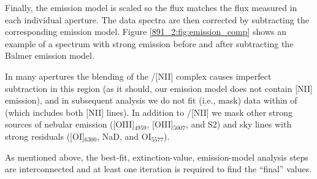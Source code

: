 Finally, the emission model is scaled so the \Ha flux matches the \Ha
flux measured in each individual aperture. The data spectra are then
corrected by subtracting the corresponding emission model. Figure
\ref{891_2:fig:emission_comp} shows an example of a spectrum with strong \HB
emission before and after subtracting the Balmer emission model.

In many apertures the blending of the \Ha/[NII] complex causes
imperfect subtraction in this region (as it should, our emission model
does not contain [NII] emission), and in subsequent analysis we do not
fit (i.e., mask) data within  of \Ha (which
includes both [NII] lines). In addition to \Ha/[NII] we mask other
strong sources of nebular emission ([OIII]$_{4959}$, [OIII]$_{5007}$,
and S2) and sky lines with strong residuals ([OI]$_{6300}$, NaD, and
OI$_{5577}$).


As mentioned above, the best-fit, extinction-value, emission-model
analysis steps are interconnected and at least one iteration is
required to find the ``final'' values.


